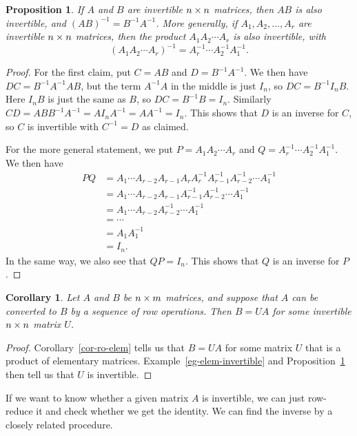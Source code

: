 \documentclass[reqno]{amsart}
\newtheorem{proposition}[theorem]{Proposition}
\newtheorem{corollary}[theorem]{Corollary}
\theoremstyle{definition}
\begin{document}
\begin{proposition}\label{prop-product-inverse}
 If $A$ and $B$ are invertible $n\times n$ matrices, then $AB$ is also
 invertible, and $(AB)^{-1}=B^{-1}A^{-1}$.  More generally, if
 $A_1,A_2,\dotsc,A_r$ are invertible $n\times n$ matrices, then the
 product $A_1A_2\dotsb A_r$ is also invertible, with 
 \[ (A_1A_2\dotsb A_r)^{-1} = A_r^{-1} \dotsb A_2^{-1} A_1^{-1}. \]
\end{proposition}
\begin{proof}
 For the first claim, put $C=AB$ and $D=B^{-1}A^{-1}$.  We then have 
 $DC=B^{-1}A^{-1}AB$, but the term $A^{-1}A$ in the middle is just
 $I_n$, so $DC=B^{-1}I_nB$.  Here $I_nB$ is just the same as $B$, so
 $DC=B^{-1}B=I_n$.  Similarly
 $CD=ABB^{-1}A^{-1}=AI_nA^{-1}=AA^{-1}=I_n$.  This shows that $D$ is
 an inverse for $C$, so $C$ is invertible with $C^{-1}=D$ as claimed.

 For the more general statement, we put $P=A_1A_2\dotsb A_r$ and
 $Q=A_r^{-1}\dotsb A_2^{-1}A_1^{-1}$.  We then have
 \begin{align*}
  PQ &= A_1\dotsb A_{r-2}A_{r-1}A_r 
        A_r^{-1}A_{r-1}^{-1}A_{r-2}^{-1}\dotsb A_1^{-1} \\
     &= A_1\dotsb A_{r-2}A_{r-1} 
        A_{r-1}^{-1}A_{r-2}^{-1}\dotsb A_1^{-1} \\
     &= A_1\dotsb A_{r-2}
        A_{r-2}^{-1}\dotsb A_1^{-1} \\
     &= \dotsb \\
     &= A_1A_1^{-1} \\
     &= I_n.
 \end{align*}
 In the same way, we also see that $QP=I_n$.  This shows that $Q$ is
 an inverse for $P$.
\end{proof}

\begin{corollary}\label{cor-ro-elem-ii}
 Let $A$ and $B$ be $n\times m$ matrices, and suppose that $A$ can be
 converted to $B$ by a sequence of row operations.  Then $B=UA$ for
 some invertible $n\times n$ matrix $U$.
\end{corollary}
\begin{proof}
 Corollary~\ref{cor-ro-elem} tells us that $B=UA$ for some matrix $U$
 that is a product of elementary matrices.
 Example~\ref{eg-elem-invertible} and
 Proposition~\ref{prop-product-inverse} then tell us that $U$ is
 invertible.  
\end{proof}

If we want to know whether a given matrix $A$ is invertible, we can
just row-reduce it and check whether we get the identity.  We can find
the inverse by a closely related procedure.
\end{document}
